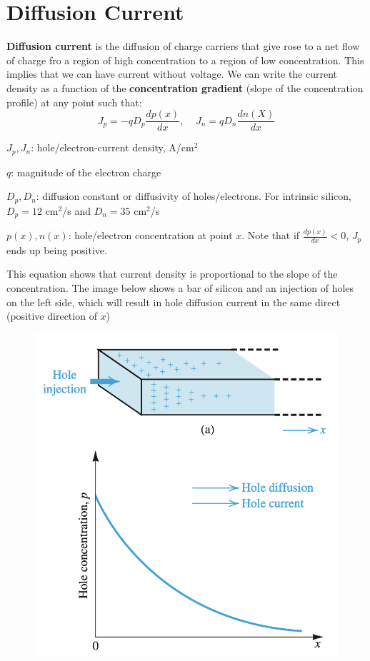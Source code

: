 \section{Diffusion Current}
\textbf{Diffusion current} is the diffusion of charge carriers that give rose to a net flow of charge fro a region of high concentration to a region of low concentration. This implies that we can have current without voltage. We can write the current density as a function of the \textbf{concentration gradient} (slope of the concentration profile) at any point such that:
    \[J_p = -q D_p \frac{dp(x)}{dx}, ~~~~~ J_n = q D_n \frac{dn(X)}{dx}\]
\begin{gline}
    \item $J_p, J_n$: hole/electron-current density, A/cm$^2$
    \item $q$: magnitude of the electron charge
    \item $D_p, D_n$: diffusion constant or diffusivity of holes/electrons. For intrinsic silicon, $D_p = 12$ cm$^2$/s and $D_n = 35$ cm$^2$/s
    \item $p(x), n(x)$: hole/electron concentration at point $x$. Note that if $\frac{dp(x)}{dx} < 0$, $J_p$ ends up being positive.
\end{gline}
This equation shows that current density is proportional to the slope of the concentration.
The image below shows a bar of silicon and an injection of holes on the left side, which will result in hole diffusion current in the same direct (positive direction of $x$)

\begin{figure}[H]
    \centering
    \includegraphics[scale=0.5]{figs/ch02/diffusion_current.png}
\end{figure}

